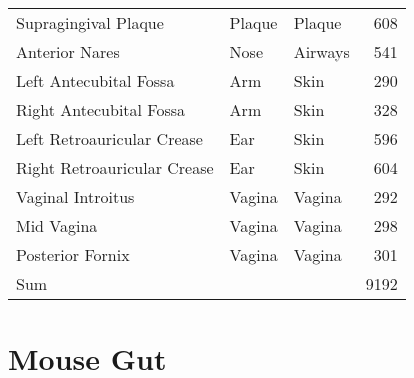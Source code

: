 \begin{table}[htbp]
{\begin{center}
\begin{tabular}{lllr}
        Supragingival Plaque            & Plaque            & Plaque            & 608   \\
        Anterior Nares                  & Nose              & Airways           & 541   \\
        Left Antecubital Fossa          & Arm               & Skin              & 290   \\
        Right Antecubital Fossa         & Arm               & Skin              & 328   \\
        Left Retroauricular Crease      & Ear               & Skin              & 596   \\
        Right Retroauricular Crease     & Ear               & Skin              & 604   \\
        Vaginal Introitus               & Vagina            & Vagina            & 292   \\
        Mid Vagina                      & Vagina            & Vagina            & 298   \\
        Posterior Fornix                & Vagina            & Vagina            & 301   \\
        \midrule
        Sum                             &                   &                   & 9192  \\
        \bottomrule
    \end{tabular}
    \end{center}
}
\end{table}


\section{Mouse Gut}
\label{supp:sec:DetailsEmpiricalDatasets:sub:MouseGut}

